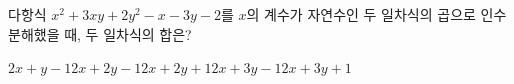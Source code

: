 다항식 $x^2+3xy+2y^2-x-3y-2$를 $x$의 계수가 자연수인 두 일차식의 곱으로 인수분해했을 때, 두 일차식의 합은?
\begin{choices32}{$2x+y-1$}{$2x+2y-1$}{$2x+2y+1$}{$2x+3y-1$}{$2x+3y+1$}\end{choices32}

